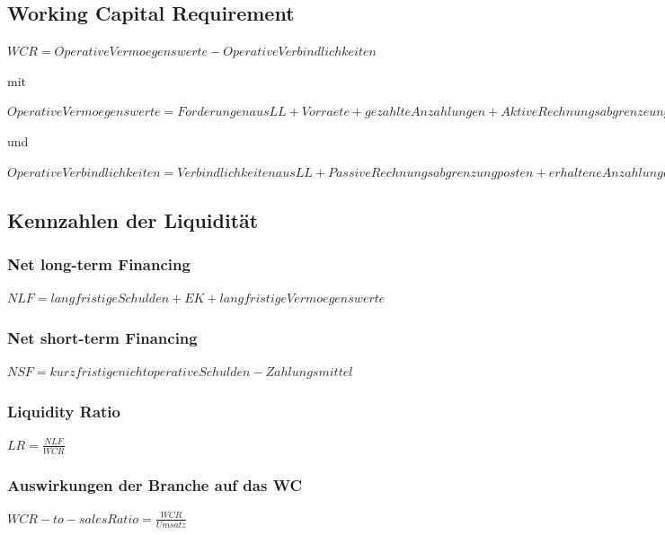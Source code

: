 \documentclass{article}
\begin{document}
\subsection{Working Capital Requirement}
\begin{center}

$WCR = Operative Vermoegenswerte - Operative Verbindlichkeiten $ 
\end{center}
mit \begin{center}
$ Operative Vermoegenswerte = Forderungen aus LL + Vorraete + gezahlte Anzahlungen + Aktive Rechnungsabgrenzeungsposten$
\end{center}
und \begin{center}
$ 
Operative Verbindlichkeiten = Verbindlichkeiten aus LL + Passive Rechnungsabgrenzungposten + erhaltene Anzahlungen + Sonstige Verbindlichkeiten fuer das operative Geschaeft $
\end{center}

\subsection{Kennzahlen der Liquidität}
\subsubsection{Net long-term Financing}
\begin{center}

$NLF = langfristige Schulden + EK + langfristige Vermoegenswerte$
\end{center}
\subsubsection{Net short-term Financing}
\begin{center}
$NSF = kurzfristige nichtoperative Schulden - Zahlungsmittel $
\end{center}
\subsubsection{Liquidity Ratio}
\begin{center}
$LR = \frac{NLF}{WCR}$
\end{center}
\subsubsection{Auswirkungen der Branche auf das WC}

\begin{center}
$WCR-to-sales Ratio = \frac{WCR}{Umsatz}$
\end{center}
\end{document}
